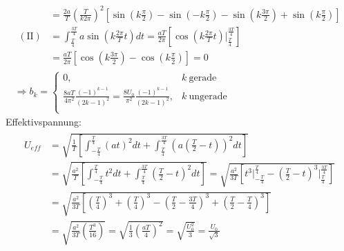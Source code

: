 \begin{gather}
\begin{aligned}
            &= \frac{2a}{T}\left(\frac{T}{k2\pi}\right)^2 \left[\sin(k\frac{\pi}{2}) - \sin(-k\frac{\pi}{2}) - \sin(k\frac{3\pi}{2}) + \sin(k\frac{\pi}{2})\right]\\[0,5cm]
        (\text{II}) &= \int^{\frac{3T}{4}}_{\frac{T}{4}}a\sin(k \frac{2\pi}{T} t)dt = \frac{aT}{2\pi} \left[\cos(k\frac{2\pi}{T}t)\bigg \vert^{\frac{3T}{4}}_{\frac{T}{4}}\right]\\
                    &= \frac{aT}{2\pi} \left[\cos(k\frac{3\pi}{2}) - \cos(k\frac{\pi}{2})\right] = 0
    \end{aligned}\\[0,5cm]
    \Rightarrow b_k =
    \begin{cases}
        0, & k~\text{gerade}\\
        \frac{8aT}{4\pi^2}\frac{(-1)^{k-1}}{(2k-1)^2} = \frac{8U_0}{\pi^2}\frac{(-1)^{k-1}}{(2k-1)^2}, & k~\text{ungerade}\\
    \end{cases}
\end{gather}
Effektivspannung:
\begin{gather}
    \begin{aligned}
        U_{eff} &= \sqrt{\frac{1}{T}\left[\int^{\frac{T}{4}}_{-\frac{T}{4}} (at)^2dt + \int^{\frac{3T}{4}}_{\frac{T}{4}} \left(a\left(\frac{T}{2}-t\right)\right)^2 dt\right]}\\
                &= \sqrt{\frac{a^2}{T}\left[\int^{\frac{T}{4}}_{-\frac{T}{4}} t^2dt + \int^{\frac{3T}{4}}_{\frac{T}{4}} \left(\frac{T}{2}-t\right)^2 dt\right]}
                = \sqrt{\frac{a^2}{3T}\left[t^3 \bigg \vert^{\frac{T}{4}}_{-\frac{T}{4}} - \left(\frac{T}{2}-t\right)^3 \bigg \vert^{\frac{3T}{4}}_{\frac{T}{4}}\right]}\\
                &= \sqrt{\frac{a^2}{3T}\left[\left(\frac{T}{4}\right)^3 + \left(\frac{T}{4}\right)^3 - \left(\frac{T}{2}- \frac{3T}{4} \right)^3 +  \left(\frac{T}{2}- \frac{T}{4} \right)^3\right]}\\
                &= \sqrt{\frac{a^2}{3T}\left(\frac{T^3}{16}\right)} = \sqrt{\frac{1}{3}\left(\frac{aT}{4}\right)^2} = \sqrt{\frac{U_0^2}{3}} = \frac{U_0}{\sqrt{3}}
     \end{aligned}
\end{gather}